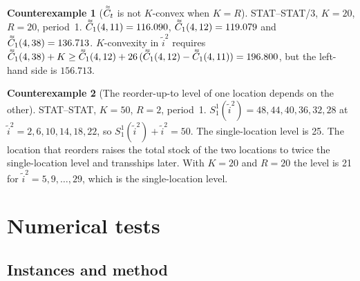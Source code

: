 \documentclass[11pt]{article}
\DeclareRobustCommand{\dbtilde}[1]{\accentset{\approx}{#1}}
\newcommand{\Cq}{\dbtilde{C}}
\theoremstyle{definition}
\newtheorem{example}{Counterexample}
\begin{document}
\begin{example}[$\Cq_t$ is not $K$-convex when $K=R$]\label{ex:kconv2}
STAT--STAT/3, $K=20$, $R=20$, period~1. $\Cq_1(4,11)=116.090$, $\Cq_1(4,12)=119.079$ and $\Cq_1(4,38)=136.713$. $K$-convexity in $\tilde{i}^2$ requires $\Cq_1(4,38)+K\ge\Cq_1(4,12)+26\,(\Cq_1(4,12)-\Cq_1(4,11))=196.800$, but the left-hand side is $156.713$.
\end{example}

\begin{example}[The reorder-up-to level of one location depends on the other]\label{ex:slope}
STAT--STAT, $K=50$, $R=2$, period~1. $S^1_1(\tilde{i}^2)=48,44,40,36,32,28$ at $\tilde{i}^2=2,6,10,14,18,22$, so $S^1_1(\tilde{i}^2)+\tilde{i}^2=50$. The single-location level is 25. The location that reorders raises the total stock of the two locations to twice the single-location level and transships later. With $K=20$ and $R=20$ the level is 21 for $\tilde{i}^2=5,9,\ldots,29$, which is the single-location level.
\end{example}

\section{Numerical tests}\label{sec:numerics}

\subsection{Instances and method}
\end{document}
